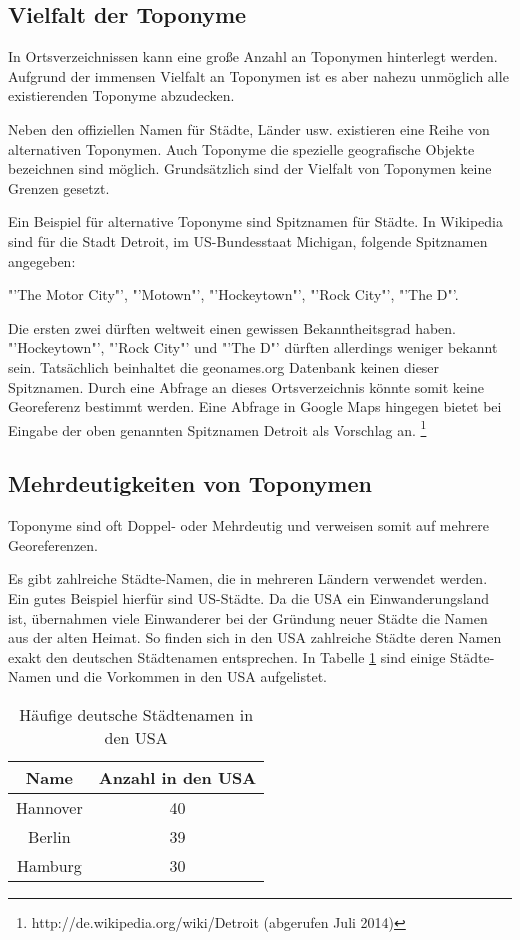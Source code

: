 		\subsection{Vielfalt der Toponyme}

			In Ortsverzeichnissen kann eine große Anzahl an Toponymen hinterlegt werden.
			Aufgrund der immensen Vielfalt an Toponymen ist es aber nahezu unmöglich alle existierenden Toponyme abzudecken. 

			Neben den offiziellen Namen für Städte, Länder usw. existieren eine Reihe von alternativen Toponymen.
			Auch Toponyme die spezielle geografische Objekte bezeichnen sind möglich.
			Grundsätzlich sind der Vielfalt von Toponymen keine Grenzen gesetzt.  

			Ein Beispiel für alternative Toponyme sind Spitznamen für Städte.
			In Wikipedia sind für die Stadt Detroit, im US-Bundesstaat Michigan, folgende Spitznamen angegeben: 

			 "'The Motor City"', "'Motown"', "'Hockeytown"', "'Rock City"', "'The D"'.

			Die ersten zwei dürften weltweit einen gewissen Bekanntheitsgrad haben. 
			"'Hockeytown"', "'Rock City"' und "'The D"' dürften allerdings weniger bekannt sein.
			Tatsächlich beinhaltet die geonames.org Datenbank keinen dieser Spitznamen.
			Durch eine Abfrage an dieses Ortsverzeichnis könnte somit keine Georeferenz bestimmt werden.
			Eine Abfrage in Google Maps hingegen bietet bei Eingabe der oben genannten Spitznamen Detroit als Vorschlag an. \footnote{http://de.wikipedia.org/wiki/Detroit (abgerufen Juli 2014)} 

		\subsection{Mehrdeutigkeiten von Toponymen} 

			Toponyme sind oft Doppel- oder Mehrdeutig und verweisen somit auf mehrere Georeferenzen.
			
			Es gibt zahlreiche Städte-Namen, die in mehreren Ländern verwendet werden.
			Ein gutes Beispiel hierfür sind US-Städte. 
			Da die USA ein Einwanderungsland ist, übernahmen viele Einwanderer bei der Gründung neuer Städte die Namen aus der alten Heimat. 
			So finden sich in den USA zahlreiche Städte deren Namen exakt den deutschen Städtenamen entsprechen. 
			In Tabelle \ref{tab:usCitiesGermanNames} sind einige Städte-Namen und die Vorkommen in den USA aufgelistet.
			
			\begin{table}[htpb]
				\caption{Häufige deutsche Städtenamen in den USA} 
				\centering
				\begin{tabular}{|c|c|}
					\hline
					Name & Anzahl in den USA \\
					\hline\hline
					Hannover & 40 \\
					\hline
					Berlin & 39 \\
					\hline
					Hamburg & 30 \\
					\hline
				\end{tabular}
				\label{tab:usCitiesGermanNames} 
			\end{table}

